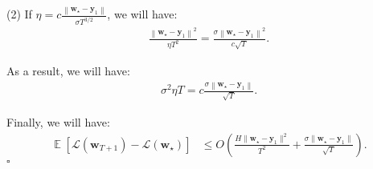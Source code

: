 \documentclass[letterpaper]{article}
\newcommand{\E}{\mathop{\mathbb{E}}}
\renewcommand{\L}{\mathcal{L}}
\newcommand{\by}{\mathbf{y}}
\newcommand{\bw}{\mathbf{w}}
\renewcommand{\qedsymbol}{\hfill $\square$}
\begin{document}
\begin{enumerate}
(2) If $\eta = c \frac{\left\|\mathbf{w}_{\star}-\mathbf{y}_1\right\|}{\sigma T^{3 / 2}}$, we will have:
\begin{equation}
	\begin{aligned}
		\frac{\left\|\mathbf{w}_{\star}-\mathbf{y}_1\right\|^2}{\eta T^2}=\frac{\sigma\left\|\mathbf{w}_{\star}-\mathbf{y}_1\right\|^2}{c\sqrt{T}}.
	\end{aligned}
\end{equation}

As a result, we will have:
\begin{equation}
	\begin{aligned}
		\sigma^2 \eta T =c \frac{\sigma\left\|\mathbf{w}_{\star}-\mathbf{y}_1\right\|}{\sqrt{T}}.
	\end{aligned}
\end{equation}

Finally, we will have:
\begin{equation}
	\begin{aligned}
		\E[\L(\bw_{T+1})-\L(\bw_\star)]&\le O\left(\frac{H\|\bw_\star - \by_1\|^2}{T^2} + \frac{\sigma \|\bw_\star -\by_1\|}{\sqrt{T}}\right).
	\end{aligned}
\end{equation}
\qedsymbol

\end{enumerate}
\end{document}
